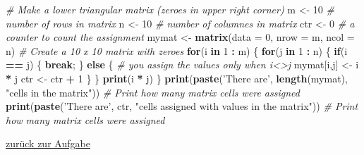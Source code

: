 \documentclass[]{article}
\newenvironment{Shaded}{\begin{snugshade}}{\end{snugshade}}
\newcommand{\KeywordTok}[1]{\textcolor[rgb]{0.13,0.29,0.53}{\textbf{#1}}}
\newcommand{\DataTypeTok}[1]{\textcolor[rgb]{0.13,0.29,0.53}{#1}}
\newcommand{\DecValTok}[1]{\textcolor[rgb]{0.00,0.00,0.81}{#1}}
\newcommand{\StringTok}[1]{\textcolor[rgb]{0.31,0.60,0.02}{#1}}
\newcommand{\CommentTok}[1]{\textcolor[rgb]{0.56,0.35,0.01}{\textit{#1}}}
\newcommand{\ControlFlowTok}[1]{\textcolor[rgb]{0.13,0.29,0.53}{\textbf{#1}}}
\newcommand{\OperatorTok}[1]{\textcolor[rgb]{0.81,0.36,0.00}{\textbf{#1}}}
\newcommand{\NormalTok}[1]{#1}
\begin{document}
\begin{Shaded}
\begin{Highlighting}[]
  \CommentTok{# Make a lower triangular matrix (zeroes in upper right corner)}
\NormalTok{  m     <-}\StringTok{ }\DecValTok{10} \CommentTok{# number of rows in matrix}
\NormalTok{  n     <-}\StringTok{ }\DecValTok{10} \CommentTok{# number of columnes in matrix}
\NormalTok{  ctr   <-}\StringTok{ }\DecValTok{0}  \CommentTok{# a counter to count the assignment}
\NormalTok{  mymat <-}\StringTok{ }\KeywordTok{matrix}\NormalTok{(}\DataTypeTok{data =} \DecValTok{0}\NormalTok{, }\DataTypeTok{nrow =}\NormalTok{ m, }\DataTypeTok{ncol =}\NormalTok{ n) }\CommentTok{# Create a 10 x 10 matrix with zeroes }
  \ControlFlowTok{for}\NormalTok{(i }\ControlFlowTok{in} \DecValTok{1} \OperatorTok{:}\StringTok{ }\NormalTok{m) \{}
    \ControlFlowTok{for}\NormalTok{(j }\ControlFlowTok{in} \DecValTok{1} \OperatorTok{:}\StringTok{ }\NormalTok{n) \{   }
      \ControlFlowTok{if}\NormalTok{(i }\OperatorTok{==}\StringTok{ }\NormalTok{j) \{ }
        \ControlFlowTok{break}\NormalTok{;}
\NormalTok{      \} }\ControlFlowTok{else}\NormalTok{ \{}
        \CommentTok{# you assign the values only when i<>j}
\NormalTok{        mymat[i,j] <-}\StringTok{ }\NormalTok{i }\OperatorTok{*}\StringTok{ }\NormalTok{j}
\NormalTok{        ctr        <-}\StringTok{ }\NormalTok{ctr }\OperatorTok{+}\StringTok{ }\DecValTok{1}
\NormalTok{      \}}
\NormalTok{    \}}
    \KeywordTok{print}\NormalTok{(i }\OperatorTok{*}\StringTok{ }\NormalTok{j) }
\NormalTok{  \}}
  \KeywordTok{print}\NormalTok{(}\KeywordTok{paste}\NormalTok{(}\StringTok{'There are'}\NormalTok{, }\KeywordTok{length}\NormalTok{(mymat), }\StringTok{"cells in the matrix"}\NormalTok{))  }\CommentTok{# Print how many matrix cells were assigned}
  \KeywordTok{print}\NormalTok{(}\KeywordTok{paste}\NormalTok{(}\StringTok{'There are'}\NormalTok{, ctr, }\StringTok{"cells assigned with values in the matrix"}\NormalTok{))  }\CommentTok{# Print how many matrix cells were assigned}
\end{Highlighting}
\end{Shaded}

\protect\hyperlink{aufgabe-2}{zurück zur Aufgabe}
\end{document}
